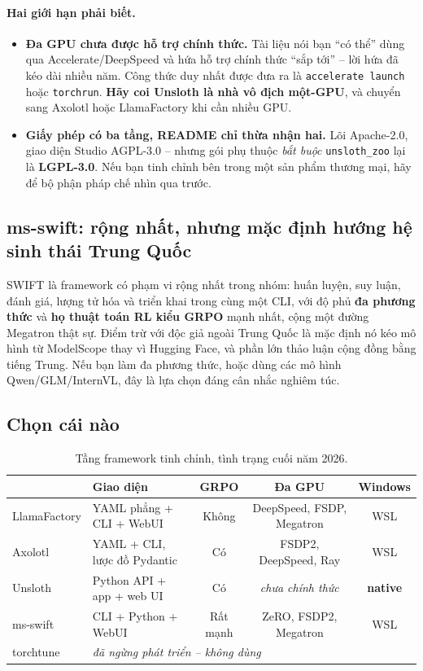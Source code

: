 \paragraph{Hai giới hạn phải biết.}
\begin{itemize}
	\item \textbf{Đa GPU chưa được hỗ trợ chính thức.} Tài liệu nói bạn “có thể” dùng qua Accelerate/DeepSpeed và hứa hỗ trợ chính thức “sắp tới” -- lời hứa đã kéo dài nhiều năm. Công thức duy nhất được đưa ra là \texttt{accelerate launch} hoặc \texttt{torchrun}. \textbf{Hãy coi Unsloth là nhà vô địch một-GPU}, và chuyển sang Axolotl hoặc LlamaFactory khi cần nhiều GPU.
	\item \textbf{Giấy phép có ba tầng, README chỉ thừa nhận hai.} Lõi Apache-2.0, giao diện Studio AGPL-3.0 -- nhưng gói phụ thuộc \emph{bắt buộc} \texttt{unsloth\_zoo} lại là \textbf{LGPL-3.0}. Nếu bạn tinh chỉnh bên trong một sản phẩm thương mại, hãy để bộ phận pháp chế nhìn qua trước.
\end{itemize}

\subsection{ms-swift: rộng nhất, nhưng mặc định hướng hệ sinh thái Trung Quốc}
\label{ssec:msswift}

SWIFT \cite{zhao2024swift} là framework có phạm vi rộng nhất trong nhóm: huấn luyện, suy luận, đánh giá, lượng tử hóa và triển khai trong cùng một CLI, với độ phủ \textbf{đa phương thức} và \textbf{họ thuật toán RL kiểu GRPO} mạnh nhất, cộng một đường Megatron thật sự. Điểm trừ với độc giả ngoài Trung Quốc là mặc định nó kéo mô hình từ ModelScope thay vì Hugging Face, và phần lớn thảo luận cộng đồng bằng tiếng Trung. Nếu bạn làm đa phương thức, hoặc dùng các mô hình Qwen/GLM/InternVL, đây là lựa chọn đáng cân nhắc nghiêm túc.

\subsection{Chọn cái nào}
\label{ssec:framework_choice}

\begin{table}[H]
\centering
\small
\begin{tabularx}{\textwidth}{@{}lXccc@{}}
\toprule
& \textbf{Giao diện} & \textbf{GRPO} & \textbf{Đa GPU} & \textbf{Windows} \\
\midrule
LlamaFactory & YAML phẳng + CLI + WebUI & Không & DeepSpeed, FSDP, Megatron & WSL \\
Axolotl & YAML + CLI, lược đồ Pydantic & Có & FSDP2, DeepSpeed, Ray & WSL \\
Unsloth & Python API + app + web UI & Có & \textit{chưa chính thức} & \textbf{native} \\
ms-swift & CLI + Python + WebUI & Rất mạnh & ZeRO, FSDP2, Megatron & WSL \\
torchtune & \multicolumn{4}{l}{\textit{đã ngừng phát triển -- không dùng}} \\
\bottomrule
\end{tabularx}
\caption{Tầng framework tinh chỉnh, tình trạng cuối năm 2026.}
\label{tab:ft_frameworks}
\end{table}

